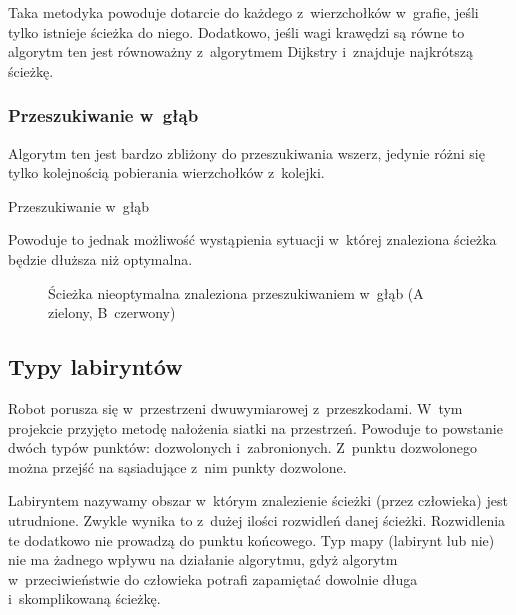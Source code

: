 \documentclass[11pt,a4paper,oneside]{mwart}
\begin{document}
Taka metodyka powoduje dotarcie do każdego z~wierzchołków w~grafie, jeśli tylko istnieje ścieżka do niego.
Dodatkowo, jeśli wagi krawędzi są równe to algorytm ten jest równoważny z~algorytmem Dijkstry i~znajduje 
najkrótszą ścieżkę.

\subsubsection{Przeszukiwanie w~głąb}
Algorytm ten jest bardzo zbliżony do przeszukiwania wszerz, jedynie różni się tylko kolejnością pobierania 
wierzchołków z~kolejki.
\begin{algorithm}
\caption{Przeszukiwanie w~głąb}
\label{algorytm_w_glab}
\begin{algorithmic}[1]
		\ENDIF
	\ENDFOR
\ENDWHILE
\end{algorithmic}
\end{algorithm}

Powoduje to jednak możliwość wystąpienia sytuacji w~której znaleziona ścieżka będzie dłuższa niż optymalna.

\begin{figure}[!h]
\centering
{}
\caption{Ścieżka nieoptymalna znaleziona przeszukiwaniem w~głąb (A zielony, B~czerwony)\label{petla}}
\end{figure}

\subsection{Typy labiryntów}
Robot porusza się w~przestrzeni dwuwymiarowej z~przeszkodami. 
W~tym projekcie przyjęto metodę nałożenia siatki na przestrzeń. 
Powoduje to powstanie dwóch typów punktów: dozwolonych i~zabronionych. 
Z~punktu dozwolonego można przejść na sąsiadujące z~nim punkty dozwolone.

Labiryntem nazywamy obszar w~którym znalezienie ścieżki (przez człowieka) jest utrudnione.
Zwykle wynika to z~dużej ilości rozwidleń danej ścieżki. 
Rozwidlenia te dodatkowo nie prowadzą do punktu końcowego. 
Typ mapy (labirynt lub nie) nie ma żadnego wpływu na działanie algorytmu, gdyż algorytm w~przeciwieństwie do 
człowieka potrafi zapamiętać dowolnie długa i~skomplikowaną ścieżkę.
\end{document}
